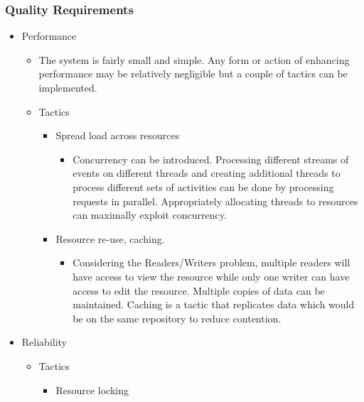 \documentclass{article}
\begin{document}
			\subsubsection{Quality Requirements}
				\begin{itemize}
		\item Performance
		\begin{itemize}
			\item The system is fairly small and simple. Any form or action of enhancing performance may be relatively negligible but a couple of tactics can be implemented. 
			
			\item Tactics
			\begin{itemize}
					\item Spread load across resources
						
						\begin{itemize}
							\item Concurrency can be introduced. Processing different streams of events on different threads and creating additional threads to process different sets of activities can be done by processing requests in parallel. Appropriately allocating threads to resources can maximally exploit concurrency. 
							
						\end{itemize}
					
					\item Resource re-use, caching.
					
						\begin{itemize}
							\item Considering the Readers/Writers problem, multiple readers will have access to view the resource while only one writer can have access to edit the resource. Multiple copies of data can be maintained. Caching is a tactic that replicates data which would be on the same repository to reduce contention.
						\end{itemize}
						
			\end{itemize}		
		\end{itemize}
		
		\item Reliability
		\begin{itemize}
			
			\item Tactics
			\begin{itemize}
				\item Resource locking
				

\end{itemize}
\end{itemize}
\end{itemize}
\end{document}
